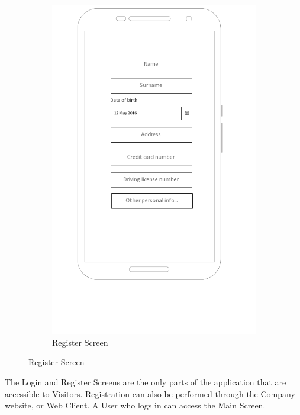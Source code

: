\documentclass[12pt]{article}
\begin{document}
\begin{figure}[h!]
\begin{subfigure}[b]{0.45\textwidth}
        \includegraphics[width=\textwidth]{../UI/RegisterScreen}
        \caption{Register Screen}
    \end{subfigure}
\end{figure}
The Login and Register Screens are the only parts of the application that are accessible to Visitors. Registration can also be performed through the Company website, or Web Client. A User who logs in can access the Main Screen.\clearpage
\end{document}
